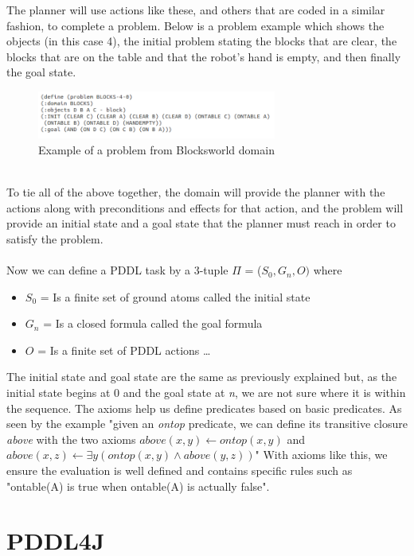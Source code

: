 The planner will use actions like these, and others that are coded in a similar fashion, to complete a problem. Below is a problem example which shows the objects (in this case 4), the initial problem stating the blocks that are clear, the blocks that are on the table and that the robot's hand is empty, and then finally the goal state. 
\begin{figure}[!htb]
    \centering
    \includegraphics[scale=2.0,width=0.70\textwidth]{BlocksworldProblem.png}
    \caption{Example of a problem from Blocksworld 
    domain}
    \label{fig:Blocksworld Problem}
\end{figure}
\\
To tie all of the above together, the domain will provide the planner with the actions along with preconditions and effects for that action, and the problem will provide an initial state and a goal state that the planner must reach in order to satisfy the problem. 
\\
\\
Now we can define a PDDL task by a 3-tuple $\Pi$ = ($S_0, G_n, O)$ where
\begin{itemize}
\item $S_0$ = Is a finite set of ground atoms called the initial state
\item $G_n$ = Is a closed formula called the goal formula
\item $O$ = Is a finite set of PDDL actions \cite{ConciseDomain} \ldots
\end{itemize} 

The initial state and goal state are the same as previously explained but, as the initial state begins at 0 and the goal state at \textit{n}, we are not sure where it is within the sequence. The axioms help us define predicates based on basic predicates. As seen by the example "given an \textit{ontop} predicate, we can define its transitive closure \textit{above} with the two axioms \textit{$above(x,y) \leftarrow ontop(x,y)$} and \textit{$above(x,z) \leftarrow \exists y(ontop(x,y)\wedge above(y,z))$}" \cite{ConciseDomain} With axioms like this, we ensure the evaluation is well defined and contains specific rules such as "ontable(A) is true when ontable(A) is actually false".   

\section{PDDL4J}

